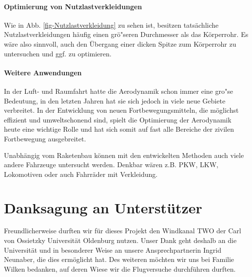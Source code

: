 \documentclass[10pt,a4paper]{article}
\begin{document}
\paragraph{Optimierung von Nutzlastverkleidungen}
Wie in Abb. \ref{fig-Nutzlastverkleidung} zu sehen ist, besitzen tatsächliche Nutzlastverkleidungen häufig einen grö"seren Durchmesser als das Körperrohr. Es wäre also sinnvoll, auch den Übergang einer dicken Spitze zum Körperrohr zu untersuchen und ggf. zu optimieren.

\paragraph{Weitere Anwendungen}
In der Luft- und Raumfahrt hatte die Aerodynamik schon immer eine gro"se Bedeutung, in den letzten Jahren hat sie sich jedoch in viele neue Gebiete verbreitet. In der Entwicklung von neuen Fortbewegungsmitteln, die möglichst effizient und umweltschonend sind, spielt die Optimierung der Aerodynamik heute eine wichtige Rolle und hat sich somit auf fast alle Bereiche der zivilen Fortbewegung ausgebreitet.

Unabhängig vom Raketenbau können mit den entwickelten Methoden auch viele andere Fahrzeuge untersucht werden. Denkbar wären z.B. PKW, LKW, Lokomotiven oder auch Fahrräder mit Verkleidung.



\appendix
\section{Danksagung an Unterstützer}

Freundlicherweise durften wir für dieses Projekt den Windkanal TWO der Carl von Ossietzky Universität Oldenburg nutzen. Unser Dank geht deshalb an die Universität und in besonderer Weise an unsere Ansprechpartnerin Ingrid Neunaber, die dies ermöglicht hat. Des weiteren möchten wir uns bei Familie Wilken bedanken, auf deren Wiese wir die Flugversuche durchführen durften.

\end{document}
